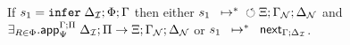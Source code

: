 \iffalse
\begin{theorem}[One rule]\label{thm:one_rule}
If $\transs{\dostate{\Delta}{\Phi}{\Gamma}{\Pi}}{\finalstate{\Xi}{\gammanew}{\deltanew}}$
then $\exists_{R \in \Phi}$ such that
$\transs{\dostate{\Delta}{R}{\Gamma}{\Pi}}{\finalstate{\Xi}{\gammanew}{\deltanew}}$
\end{theorem}
\begin{proof}
Induction on the size of $\Phi$.

Assume $\Phi = A \lolli B, \Phi'$ and $\rulestk = (\Delta; \Phi')$.
Apply two steps to the first state of the assumption to get
$\matstate{A \lolli B}{\rulestk}{\cdot}{\Gamma}{\Delta}{A}{\cdot
   \rightarrow \one}$.

Applying Lemma~\ref{thm:body_match} (LHS match result) leads to two subcases:

\begin{itemize}[leftmargin=*]
   \item Match fails: \\
   $\contstate{A \lolli B}{\rulestk}{\cdot}{\Gamma}$ \hfill (1) \\

   $\dostate{\Delta}{\Phi'}{\Gamma}{\Pi}$ \hfill (2) state after (1) \\
   $\transs{\dostate{\Delta}{R'}{\Gamma}{\Pi}}{\finalstate{\Xi}{\gammanew}{\deltanew}}$
   \hfill (3) i.h. on (2) where $R' \in \Phi'$ \\

   \item Match succeeds: \\

   $\matstate{A \lolli B}{\rulestk}{\lstack{C}}{\Gamma}{\Delta_1}{\cdot}{\Delta'
      \rightarrow split(A)}$ \\ \hfill (1) \\
   $\mo \Gamma; \Delta; \cdot; A; B; \cdot; (\cdot, \Delta) \rightarrow \outsem$ \hfill (1)\\
   $\ao \Gamma; \Delta; A \lolli B; (\cdot, \Delta) \rightarrow \outsem$ \hfill (2) rule $\ao \m{rule}$ on (1) \\
   $\doo \Gamma; \Delta; A \lolli B \rightarrow \outsem$ \hfill (3) rule $\doo \m{rule}$ on (2) \\
\end{itemize}
\end{proof}
\fi


\begin{theorem}[Soundness]\label{thm:soundness}
If $s_1 = \dostate{\deltan}{\Phi}{\Gamma}{\Pi}$
then either $\transs{s_1}{\finalstate{\Xi}{\gammanew}{\deltanew}}$
and $\exists_{R \in \Phi}. \az{\Psi}{\Gamma}{\deltan}{\Pi}{R}{\Xi; \gammanew;
      \deltanew}$
or $\transs{s_1}{\failstate{\Gamma}{\deltan}}$.
\end{theorem}

